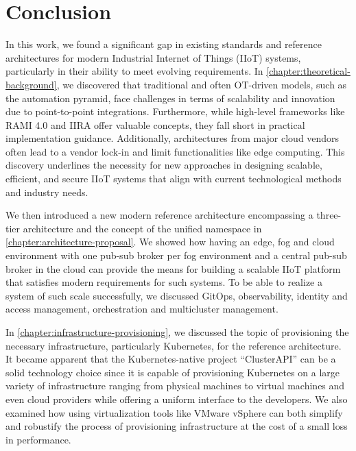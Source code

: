 \chapter{Conclusion}
\label{chapter:conclusion}
        In this work, we found a significant gap in existing standards and reference architectures for modern Industrial Internet of Things (IIoT) systems, particularly in their ability to meet evolving requirements. In \autoref{chapter:theoretical-background}, we discovered that traditional and often OT-driven models, such as the automation pyramid, face challenges in terms of scalability and innovation due to point-to-point integrations. Furthermore, while high-level frameworks like RAMI 4.0 and IIRA offer valuable concepts, they fall short in practical implementation guidance. Additionally, architectures from major cloud vendors often lead to a vendor lock-in and limit functionalities like edge computing. This discovery underlines the necessity for new approaches in designing scalable, efficient, and secure IIoT systems that align with current technological methods and industry needs. \newline
    
        We then introduced a new modern reference architecture encompassing a three-tier architecture and the concept of the unified namespace in \autoref{chapter:architecture-proposal}. We showed how having an edge, fog and cloud environment with one pub-sub broker per fog environment and a central pub-sub broker in the cloud can provide the means for building a scalable IIoT platform that satisfies modern requirements for such systems. To be able to realize a system of such scale successfully, we discussed GitOps, observability, identity and access management, orchestration and multicluster management. \newline
    
        In \autoref{chapter:infrastructure-provisioning}, we discussed the topic of provisioning the necessary infrastructure, particularly Kubernetes, for the reference architecture. It became apparent that the Kubernetes-native project ``ClusterAPI'' can be a solid technology choice since it is capable of provisioning Kubernetes on a large variety of infrastructure ranging from physical machines to virtual machines and even cloud providers while offering a uniform interface to the developers. We also examined how using virtualization tools like VMware vSphere can both simplify and robustify the process of provisioning infrastructure at the cost of a small loss in performance. \newline

